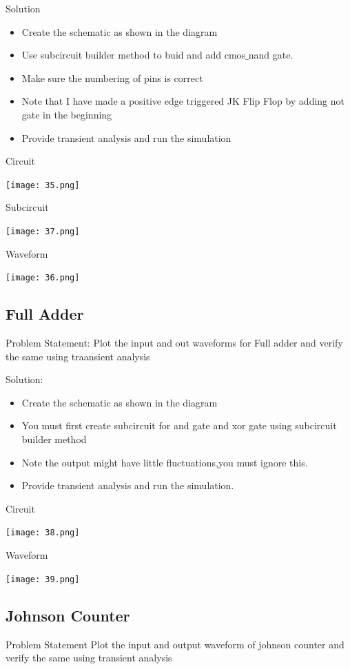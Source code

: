 \documentclass[12pt,a4paper]{  report}
\begin{document}
Solution
\begin{itemize}
\item Create the schematic as shown in the diagram
\item Use subcircuit builder method to buid and add  cmos$\_$nand gate.
\item Make sure the numbering of pins is correct
\item Note that I have made a positive edge  triggered JK Flip Flop by adding not gate in the beginning
\item Provide transient analysis and run the simulation
\end{itemize}

Circuit
\begin{flushleft}
\texttt{[image: 35.png]}
\end{flushleft}

 Subcircuit
\begin{flushleft}
\texttt{[image: 37.png]}
\end{flushleft}

Waveform
\begin{flushleft}
\texttt{[image: 36.png]}
\end{flushleft}

\subsection{Full Adder}
Problem Statement:
Plot the input and out waveforms for Full adder and verify the same using traansient analysis

Solution:
\begin{itemize}
\item Create the schematic as shown in the diagram
\item You must first create subcircuit for and gate and xor gate using subcircuit builder method
\item Note the output might have little fluctuations,you must ignore this.
\item Provide transient analysis and run the simulation.
\end{itemize}

Circuit
\begin{flushleft}
\texttt{[image: 38.png]}
\end{flushleft}
Waveform
\begin{flushleft}
\texttt{[image: 39.png]}
\end{flushleft}

\subsection{Johnson Counter}
Problem Statement
Plot the input and output waveform of johnson counter and verify the same using transient analysis
\end{document}
